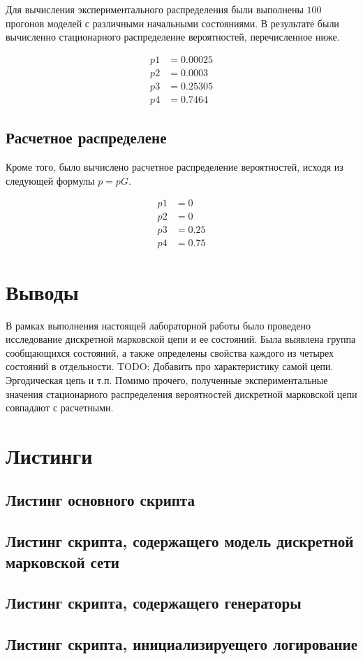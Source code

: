 Для вычисления экспериментального распределения были выполнены $100$ прогонов моделей с различными начальными состояниями.
В результате были вычисленно стационарного распределение вероятностей, перечисленное ниже.

\begin{align*}
    p1 & = 0.00025\\
    p2 & = 0.0003\\
    p3 & = 0.25305\\
    p4 & = 0.7464
\end{align*}

\subsection*{Расчетное распределене}

Кроме того, было вычислено расчетное распределение вероятностей, исходя из следующей формулы $p=pG$.

\begin{align*}
    p1 & = 0\\
    p2 & = 0\\
    p3 & = 0.25\\
    p4 & = 0.75
\end{align*}

\section*{Выводы}

В рамках выполнения настоящей лабораторной работы было проведено исследование дискретной марковской цепи и ее состояний.
Была выявлена группа сообщающихся состояний, а также определены свойства каждого из четырех состояний в отдельности.
TODO: Добавить про характеристику самой цепи. Эргодическая цепь и т.п.
Помимо прочего, полученные экспериментальные значения стационарного распределения вероятностей дискретной марковской цепи совпадают с
расчетными.

\section*{Листинги}

\subsection*{Листинг основного скрипта}


\subsection*{Листинг скрипта, содержащего модель дискретной марковской сети}


\subsection*{Листинг скрипта, содержащего генераторы}


\subsection*{Листинг скрипта, инициализируещего логирование}


